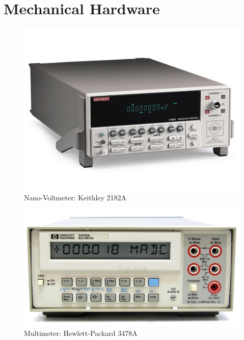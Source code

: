 \documentclass[12pt, titlepage]{article}
\begin{document}

\section{Mechanical Hardware}
\label{Apx.HWC}

\begin{figure}[H]
\centerline{\includegraphics[scale=0.5]{1.jpg}}
\caption{Nano-Voltmeter: Keithley 2182A}
\label{fig}
\end{figure}

\begin{figure}[H]
\centerline{\includegraphics[scale=1]{2.jpg}}
\caption{Multimeter: Hewlett-Packard 3478A}
\label{fig}
\end{figure}
\end{document}
